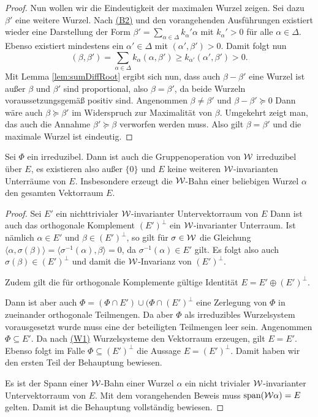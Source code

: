 \begin{proof}
  Nun wollen wir die Eindeutigkeit der maximalen Wurzel zeigen.
  Sei dazu $\beta'$ eine weitere Wurzel.
  Nach \hyperref[it:B2]{(B2)} und den vorangehenden Ausführungen existiert wieder eine Darstellung der Form $\beta' = \sum_{\alpha \in \Delta} k_\alpha' \alpha$ mit $k_\alpha' > 0$ für alle $\alpha \in \Delta$.
  Ebenso existiert mindestens ein $\alpha' \in \Delta$ mit $(\alpha', \beta') > 0$.
  Damit folgt nun
  \begin{displaymath}
    (\beta, \beta') = \sum_{\alpha \in \Delta} k_\alpha (\alpha, \beta') \geq k_{\alpha'} (\alpha', \beta') > 0.
  \end{displaymath}
  Mit Lemma \ref{lem:sumDiffRoot} ergibt sich nun, dass auch $\beta - \beta'$ eine Wurzel ist außer $\beta$ und $\beta'$ sind proportional, also $\beta = \beta'$, da beide Wurzeln voraussetzungsgemäß positiv sind.
  Angenommen $\beta \neq \beta'$ und $\beta - \beta' \succeq 0$
  Dann wäre auch $\beta \succeq \beta'$ im Widerspruch zur Maximalität von $\beta$.
  Umgekehrt zeigt man, das auch die Annahme $\beta' \succeq \beta$ verworfen werden muss.
  Also gilt $\beta = \beta'$ und die maximale Wurzel ist eindeutig.
\end{proof}

\begin{lem}
  \label{lem:irreducibleGroupOp}
  Sei $\Phi$ ein irreduzibel.
  Dann ist auch die Gruppenoperation von $\mathcal{W}$ irreduzibel über $E$, es existieren also außer $\{0\}$ und $E$ keine weiteren $\mathcal{W}$\hyp{}invarianten Unterräume von $E$.
  Insbesondere erzeugt die $\mathcal{W}$\hyp{}Bahn einer beliebigen Wurzel $\alpha$ den gesamten Vektorraum $E$.
\end{lem}

\begin{proof}
  Sei $E'$ ein nichttrivialer $\mathcal{W}$\hyp{}invarianter Untervektorraum von $E$
  Dann ist auch das orthogonale Komplement $(E')^\perp$ ein $\mathcal{W}$\hyp{}invarianter Unterraum.
  Ist nämlich $\alpha \in E'$ und $\beta \in (E')^\perp$, so gilt für $\sigma \in \mathcal{W}$ die Gleichung
  $\langle \alpha, \sigma(\beta) \rangle = \langle \sigma^{-1}(\alpha), \beta \rangle = 0$, da $\sigma^{-1}(\alpha) \in E'$ gilt.
  Es folgt also auch $\sigma(\beta) \in (E')^\perp$ und damit die $\mathcal{W}$\hyp{}Invarianz von $(E')^\perp$.

  Zudem gilt die für orthogonale Komplemente gültige Identität $E = E' \oplus (E')^\perp$.

  Dann ist aber auch $\Phi = (\Phi \cap E') \cup (\Phi \cap (E')^\perp$ eine Zerlegung von $\Phi$ in zueinander orthogonale Teilmengen.
  Da aber $\Phi$ als irreduzibles Wurzelsystem vorausgesetzt wurde muss eine der beteiligten Teilmengen leer sein.
  Angenommen $\Phi \subseteq E'$. 
  Da nach \hyperref[it:W1]{(W1)} Wurzelsysteme den Vektorraum erzeugen, gilt $E = E'$. 
  Ebenso folgt im Falle $\Phi \subseteq (E')^\perp$ die Aussage $E = (E')^\perp$.
  Damit haben wir den ersten Teil der Behauptung bewiesen.

  Es ist der Spann einer $\mathcal{W}$\hyp{}Bahn einer Wurzel $\alpha$ ein nicht trivialer $\mathcal{W}$\hyp{}invarianter Untervektorraum von $E$.
  Mit dem vorangehenden Beweis muss $\operatorname{span}(\mathcal{W}\alpha) = E$ gelten.
  Damit ist die Behauptung vollständig bewiesen.
\end{proof}

